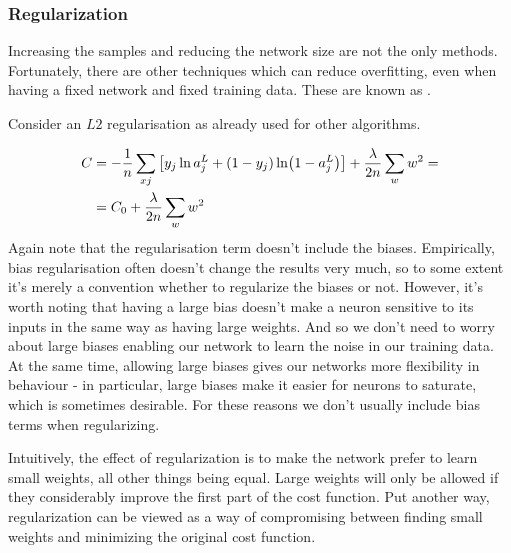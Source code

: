 \subsubsection{Regularization}
Increasing the samples and reducing the network size are not the only methods. Fortunately, there are other techniques which can reduce overfitting, even when having a fixed network and fixed training data. These are known as .

Consider an $L2$ regularisation as already used for other algorithms.

\begin{equation}
\begin{aligned}
C &= -\frac{1}{n} \sum_{xj} \left[y_j \ln a_j^L +\br{1-y_j} \ln \br{1-a_j^L}\right] + \frac{\lambda}{2n} \sum_w w^2 = \\
&=C_0 +  \frac{\lambda}{2n} \sum_w w^2
\end{aligned}
\end{equation}
Again note that the regularisation term doesn't include the biases. Empirically, bias regularisation often doesn't change the results very much, so to some extent it's merely a convention whether to regularize the biases or not. However, it's worth noting that having a large bias doesn't make a neuron sensitive to its inputs in the same way as having large weights. And so we don't need to worry about large biases enabling our network to learn the noise in our training data. At the same time, allowing large biases gives our networks more flexibility in behaviour - in particular, large biases make it easier for neurons to saturate, which is sometimes desirable. For these reasons we don't usually include bias terms when regularizing.

Intuitively, the effect of regularization is to make the network prefer to learn small weights, all other things being equal. Large weights will only be allowed if they considerably improve the first part of the cost function. Put another way, regularization can be viewed as a way of compromising between finding small weights and minimizing the original cost function.

